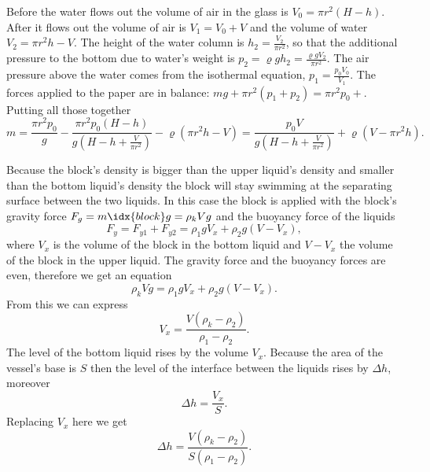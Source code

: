 \documentclass[11pt]{article}
\begin{document}

\solueng
Before the water flows out the volume of air in the glass is $V_0 = \pi r^2 (H-h)$. After it flows out the volume of air is $V_1 = V_0 + V$ and the volume of water $V_2 = \pi r^2 h - V$. The height of the water column is $h_2 = \frac{ V_2 }{ \pi r^2 }$, so that the additional pressure to the bottom due to water’s weight is $p_2 = \varrho g h_2 = \frac{ \varrho g V_2 }{ \pi r^2 }$. The air pressure above the water comes from the isothermal equation, $p_1 = \frac{p_0 V_0}{V_1}$. The forces applied to the paper are in balance: $mg + \pi r^2 (p_1 + p_2) = \pi r^2 p_0+$. Putting all those together
\[ m =
\frac{ \pi r^2 p_0 }{ g } -
\frac{ \pi r^2 p_0 (H-h) }{ g \left( H - h + \frac{V}{\pi r^2} \right) } -
\varrho \left( \pi r^2 h - V \right)
=
\frac{ p_0 V }{ g \left( H - h + \frac{V}{ \pi r^2 } \right) } + \varrho \left( V - \pi r^2 h \right).
\]
\probend
\bigskip


\solueng
Because the block’s density is bigger than the upper liquid’s density and smaller than the bottom liquid’s density the block will stay swimming at the separating surface between the two liquids. In this case the block is applied with the block’s gravity force $F_g = m\idx{block}g=\rho_k Vg$ and the buoyancy force of the liquids 
\[ F_y=F_{y1}+F_{y2}=\rho_1gV_x + \rho_2g(V-V_x), \]
where $V_x$ is the volume of the block in the bottom liquid and $V-V_x$ the volume of the block in the upper liquid. The gravity force and the buoyancy forces are even, therefore we get an equation 
\[ \rho_k Vg = \rho_1gV_x + \rho_2g(V-V_x). \]
From this we can express
\[ V_x = \frac{V(\rho_k-\rho_2)}{\rho_1-\rho_2}. \]
The level of the bottom liquid rises by the volume $V_x$. Because the area of the vessel’s base is $S$ then the level of the interface between the liquids rises by $\Delta h$, moreover
\[ \Delta h = \frac{V_x}{S}. \]
Replacing $V_x$ here we get
\[ \Delta h = \frac{V(\rho_k-\rho_2)}{S(\rho_1-\rho_2)}. \]
\probend
\bigskip

\end{document}
